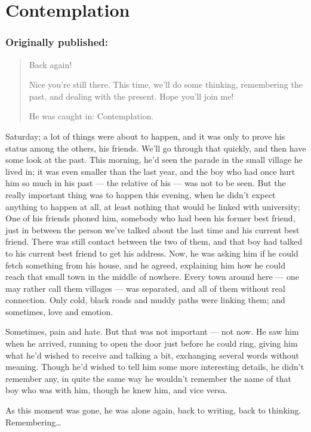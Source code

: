 \chapter{Contemplation}
\label{cha:contemplation}
\subsection*{Originally published: }
\begin{quote}
Back again!

Nice you're still there. This time, we'll do some thinking, remembering the past, and dealing with the present. Hope you'll join me!

He was caught in: Contemplation.
\end{quote}

Saturday; a lot of things were about to happen, and it was only to prove his status among the others, his friends. We'll go through that quickly, and then have some look at the past. 
This morning, he'd seen the parade in the small village he lived in; it was even smaller than the last year, and the boy who had once hurt him so much in his past --- the relative of his --- was not to be seen. But the really important thing was to happen this evening, when he didn't expect anything to happen at all, at least nothing that would be linked with university; One of his friends phoned him, somebody who had been his former best friend, just in between the person we've talked about the last time and his current best friend. There was still contact between the two of them, and that boy had talked to his current best friend to get his address. Now, he was asking him if he could fetch something from his house, and he agreed, explaining him how he could reach that small town in the middle of nowhere. Every town around here --- one may rather call them villages --- was separated, and all of them without real connection. Only cold, black roads and muddy paths were linking them; and sometimes, love and emotion.

Sometimes, pain and hate. But that was not important --- not now. He saw him when he arrived, running to open the door just before he could ring, giving him what he'd wished to receive and talking a bit, exchanging several words without meaning. Though he'd wished to tell him some more interesting details, he didn't remember any, in quite the same way he wouldn't remember the name of that boy who was with him, though he knew him, and vice versa.

As this moment was gone, he was alone again, back to writing, back to thinking. 
Remembering\ldots

